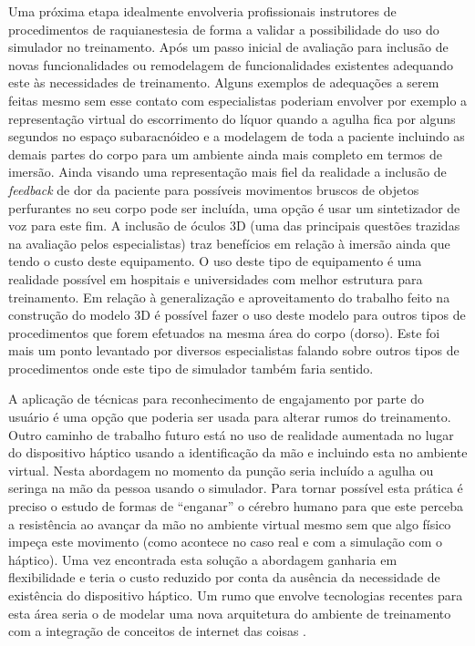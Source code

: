 Uma próxima etapa idealmente envolveria profissionais instrutores de procedimentos de raquianestesia de forma a validar a possibilidade do uso do simulador no treinamento. Após um passo inicial de avaliação para inclusão de novas funcionalidades ou remodelagem de funcionalidades existentes adequando este às necessidades de treinamento. Alguns exemplos de adequações a serem feitas mesmo sem esse contato com especialistas poderiam envolver por exemplo a representação virtual do escorrimento do líquor quando a agulha fica por alguns segundos no espaço subaracnóideo e a modelagem de toda a paciente incluindo as demais partes do corpo para um ambiente ainda mais completo em termos de imersão. Ainda visando uma representação mais fiel da realidade a inclusão de \textit{feedback} de dor da paciente para possíveis movimentos bruscos de objetos perfurantes no seu corpo pode ser incluída, uma opção é usar um sintetizador de voz para este fim. A inclusão de óculos 3D (uma das principais questões trazidas na avaliação pelos especialistas) traz benefícios em relação à imersão ainda que tendo o custo deste equipamento. O uso deste tipo de equipamento é uma realidade possível em hospitais e universidades com melhor estrutura para treinamento.
Em relação à generalização e aproveitamento do trabalho feito na construção do modelo 3D é possível fazer o uso deste modelo para outros tipos de procedimentos que forem efetuados na mesma área do corpo (dorso). Este foi mais um ponto levantado por diversos especialistas falando sobre outros tipos de procedimentos onde este tipo de simulador também faria sentido.

A aplicação de técnicas para reconhecimento de engajamento por parte do usuário \cite{Mitsis2022} é uma opção que poderia ser usada para alterar rumos do treinamento.
Outro caminho de trabalho futuro está no uso de realidade aumentada no lugar do dispositivo háptico usando a identificação da mão e incluindo esta no ambiente virtual. Nesta abordagem no momento da punção seria incluído a agulha ou seringa na mão da pessoa usando o simulador. Para tornar possível esta prática é preciso o estudo de formas de ``enganar'' o cérebro humano para que este perceba a resistência ao avançar da mão no ambiente virtual mesmo sem que algo físico impeça este movimento (como acontece no caso real e com a simulação com o háptico). Uma vez encontrada esta solução a abordagem ganharia em flexibilidade e teria o custo reduzido por conta da ausência da necessidade de existência do dispositivo háptico. Um rumo que envolve tecnologias recentes para esta área seria o de modelar uma nova arquitetura do ambiente de treinamento com a integração de conceitos de internet das coisas \cite{Ahmad2022}.